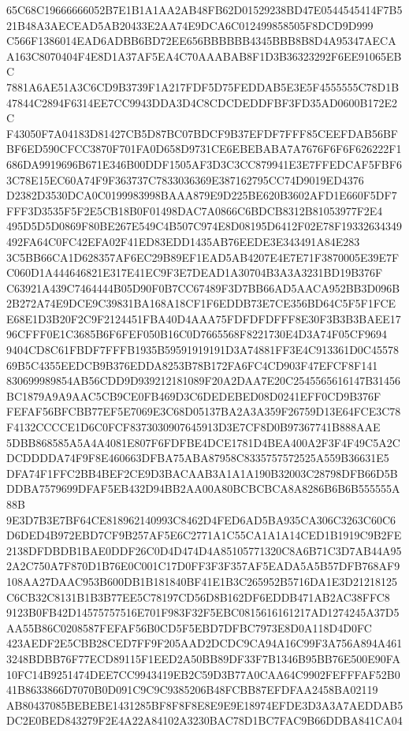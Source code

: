 \documentclass[UTF8,fontset=fandol,zihao=-4,a4paper]{ctexart}
\begin{document}
{{65C68C19666666052B7E1B1A1AA2AB48FB62D01529238BD47E0544545414F7B521B48A3AECEAD5AB20433E2AA74E9DCA6C012499858505F8DCD9D999
C566F1386014EAD6ADBB6BD72EE656BBBBBB4345BBB8B8D4A95347AECAA163C8070404F4E8D1A37AF5EA4C70AAABAB8F1D3B36323292F6EE91065EBC
7881A6AE51A3C6CD9B3739F1A217FDF5D75FEDDAB5E3E5F4555555C78D1B47844C2894F6314EE7CC9943DDA3D4C8CDCDEDDFBF3FD35AD0600B172E2C
F43050F7A04183D81427CB5D87BC07BDCF9B37EFDF7FFF85CEEFDAB56BFBF6ED590CFCC3870F701FA0D658D9731CE6EBEBABA7A7676F6F6F626222F1
686DA9919696B671E346B00DDF1505AF3D3C3CC879941E3E7FFEDCAF5FBF63C78E15EC60A74F9F363737C7833036369E387162795CC74D9019ED4376
D2382D3530DCA0C0199983998BAAA879E9D225BE620B3602AFD1E660F5DF7FFF3D3535F5F2E5CB18B0F01498DAC7A0866C6BDCB8312B81053977F2E4
495D5D5D0869F80BE267E549C4B507C974E8D08195D6412F02E78F19332634349492FA64C0FC42EFA02F41ED83EDD1435AB76EEDE3E343491A84E283
3C5BB66CA1D628357AF6EC29B89EF1EAD5AB4207E4E7E71F3870005E39E7FC060D1A444646821E317E41EC9F3E7DEAD1A30704B3A3A3231BD19B376F
C63921A439C7464444B05D90F0B7CC67489F3D7BB66AD5AACA952BB3D096B2B272A74E9DCE9C39831BA168A18CF1F6EDDB73E7CE356BD64C5F5F1FCE
E68E1D3B20F2C9F2124451FBA40D4AAA75FDFDFDFFF8E30F3B3B3BAEE1796CFFF0E1C3685B6F6FEF050B16C0D7665568F8221730E4D3A74F05CF9694
9404CD8C61FBDF7FFFB1935B59591919191D3A74881FF3E4C913361D0C4557869B5C4355EEDCB9B376EDDA8253B78B172FA6FC4CD903F47EFCF8F141
830699989854AB56CDD9D939212181089F20A2DAA7E20C2545565616147B31456BC1879A9A9AAC5CB9CE0FB469D3C6DEDEBED08D0241EFF0CD9B376F
FEFAF56BFCBB77EF5E7069E3C68D05137BA2A3A359F26759D13E64FCE3C78F4132CCCCE1D6C0FCF8373030907645913D3E7CF8D0B97367741B888AAE
5DBB868585A5A4A4081E807F6FDFBE4DCE1781D4BEA400A2F3F4F49C5A2CDCDDDDA74F9F8E460663DFBA75ABA87958C8335757572525A559B36631E5
DFA74F1FFC2BB4BEF2CE9D3BACAAB3A1A1A190B32003C28798DFB66D5BDDBA7579699DFAF5EB432D94BB2AA00A80BCBCBCA8A8286B6B6B555555A88B
9E3D7B3E7BF64CE818962140993C8462D4FED6AD5BA935CA306C3263C60C6D6DED4B972EBD7CF9B257AF5E6C2771A1C55CA1A1A14CED1B1919C9B2FE
2138DFDBDB1BAE0DDF26C0D4D474D4A85105771320C8A6B71C3D7AB44A952A2C750A7F870D1B76E0C001C17D0FF3F3F357AF5EADA5A5B57DFB768AF9
108AA27DAAC953B600DB1B181840BF41E1B3C265952B5716DA1E3D21218125C6CB32C8131B1B3B77EE5C78197CD56D8B162DF6EDDB471AB2AC38FFC8
9123B0FB42D14575757516E701F983F32F5EBC0815616161217AD1274245A37D5AA55B86C0208587FEFAF56B0CD5F5EBD7DFBC7973E8D0A118D4D0FC
423AEDF2E5CBB28CED7FF9F205AAD2DCDC9CA94A16C99F3A756A894A4613248BDBB76F77ECD89115F1EED2A50BB89DF33F7B1346B95BB76E500E90FA
10FC14B9251474DEE7CC9943419EB2C59D3B77A0CAA64C9902FEFFFAF52B041B8633866D7070B0D091C9C9C9385206B48FCBB87EFDFAA2458BA02119
AB80437085BEBEBE1431285BF8F8F8E8E9E9E18974EFDE3D3A3A7AEDDAB5DC2E0BED843279F2E4A22A84102A3230BAC78D1BC7FAC9B66DDBA841CA04
}}
\end{document}
